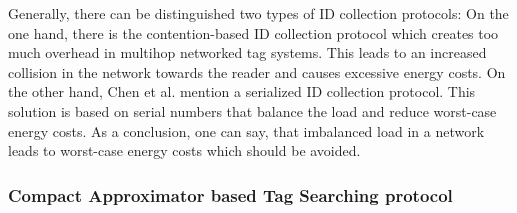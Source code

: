 Generally, there can be distinguished two types of ID collection protocols: On the one hand, there is the contention-based ID collection protocol which creates too much overhead in multihop networked tag systems. This leads to an increased collision in the network towards the reader and causes excessive energy costs. On the other hand, Chen et al. mention a serialized ID collection protocol. This solution is based on serial numbers that balance the load and reduce worst-case energy costs. 
As a conclusion, one can say, that imbalanced load in a network leads to worst-case energy costs which should be avoided.

\subsubsection{Compact Approximator based Tag Searching protocol}

